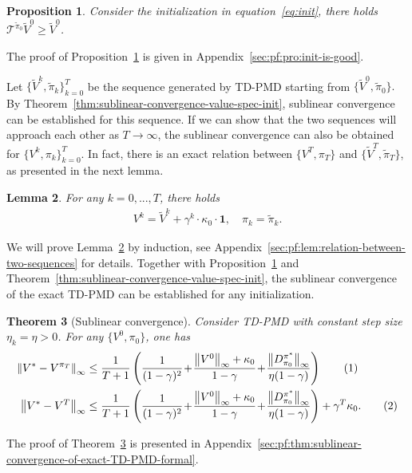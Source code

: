 \documentclass[10pt]{article}
\newcommand{\calT}{\mathcal{T}}
\newcommand{\ls}{\left}
\newcommand{\rs}{\right}
\newcommand\numberthis{\addtocounter{equation}{1}\tag{\theequation}}
\theoremstyle{plain}
\newtheorem{theorem}{Theorem}[section]
\newtheorem{proposition}[theorem]{Proposition}
\newtheorem{lemma}[theorem]{Lemma}
\theoremstyle{definition}
\begin{document}
\begin{proposition}
    Consider the initialization in equation~\eqref{eq:init}, there holds $\calT^{\tilde{\pi}_0} \tilde{V}^0 \geq \tilde{V}^0$.
    \label{pro:init-is-good}
\end{proposition}
The proof of Proposition~\ref{pro:init-is-good} is given in Appendix~\ref{sec:pf:pro:init-is-good}.

Let $\{ \tilde{V}^k, \tilde{\pi}_k \}_{k=0}^T$ be the sequence generated by TD-PMD starting from $\{\tilde{V}^0,\tilde{\pi}_0\}.$  By Theorem~\ref{thm:sublinear-convergence-value-spec-init}, sublinear convergence can be established for this sequence. If we can show that the two sequences will approach each other as $T\rightarrow \infty$, the sublinear convergence can also be obtained for $\{{V}^k, {\pi}_k \}_{k=0}^T$. In fact, 
there is an   exact relation between $\{ V^T, \pi_T \}$ and $\{ \tilde{V}^T, \tilde{\pi}_T \}$, as presented in the next lemma.

\begin{lemma}
    For any $k=0, ..., T$, there holds
    \begin{align}
        V^k = \tilde{V}^k + \gamma^k \cdot\kappa_0 \cdot \mathbf{1}, \quad \pi_k = \tilde{\pi}_k.
        \label{eq:relation-between-two-sequences}
    \end{align}
    \label{lem:relation-between-two-sequences}
\end{lemma}
We will prove Lemma~\ref{lem:relation-between-two-sequences}  by induction, see Appendix~\ref{sec:pf:lem:relation-between-two-sequences} for details. Together with Proposition~\ref{pro:init-is-good} and Theorem~\ref{thm:sublinear-convergence-value-spec-init}, the sublinear convergence of the exact TD-PMD can be established for any initialization.

\begin{theorem}[Sublinear convergence]
  Consider TD-PMD with constant step size $\eta_k=\eta>0$. For any $\{V^0,\pi_0\}$, one has
    \begin{align*}
        \ls\| V^* - V^{\pi_T} \rs\|_\infty &\leq \frac{1}{T+1} \ls( \frac{1}{(1-\gamma)^2} \!+\! \frac{\ls\| V^0 \rs\|_\infty + \kappa_0 }{1-\gamma} \!+\! \frac{\ls\| D^{\pi^*}_{\pi_0} \rs\|_\infty}{\eta(1-\gamma)} \rs)
        \numberthis \label{eq:sublinear-convergence-of-output-policy} \\
        \ls\| V^* - V^T \rs\|_\infty &\leq \frac{1}{T+1} \ls( \frac{1}{(1-\gamma)^2} \!+\! \frac{ \ls\| V^0 \rs\|_\infty + \kappa_0}{1-\gamma} \!+\! \frac{\ls\| D^{\pi^*}_{\pi_0} \rs\|_\infty }{\eta(1-\gamma)} \rs) + \gamma^T \kappa_0.
        \numberthis \label{eq:sublinear-convergence-of-output-value}
    \end{align*}
    \label{thm:sublinear-convergence-of-exact-TD-PMD-formal}
\end{theorem}
The proof of Theorem~\ref{thm:sublinear-convergence-of-exact-TD-PMD-formal} is presented in Appendix~\ref{sec:pf:thm:sublinear-convergence-of-exact-TD-PMD-formal}.
\end{document}
